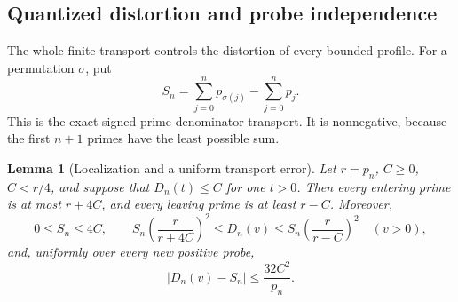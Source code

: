 \documentclass[11pt]{article}
\newtheorem{lemma}[theorem]{Lemma}
\theoremstyle{definition}
\begin{document}
\subsection{Quantized distortion and probe independence}

The whole finite transport controls the distortion of every bounded
profile. For a permutation $\sigma$, put
\[
 S_n=\sum_{j=0}^{n}p_{\sigma(j)}-\sum_{j=0}^{n}p_j.
\]
This is the exact signed prime-denominator transport. It is nonnegative,
because the first $n+1$ primes have the least possible sum.

\begin{lemma}[Localization and a uniform transport error]
Let $r=p_n$, $C\ge0$, $C<r/4$, and suppose that $D_n(t)\le C$
for one $t>0$. Then every entering prime is at most $r+4C$,
and every leaving prime is at least $r-C$. Moreover,
\[
 0\le S_n\le4C,
 \qquad
 S_n\left(\frac r{r+4C}\right)^2
 \le D_n(v)\le
 S_n\left(\frac r{r-C}\right)^2
 \quad(v>0),
\]
and, uniformly over every new positive probe,
\[
 \left|D_n(v)-S_n\right|\le\frac{32C^2}{p_n}.
\]
\end{lemma}
\end{document}
